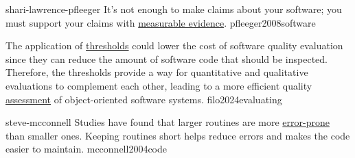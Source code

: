 \documentclass{article}
\begin{document}

\lnQuote
  {shari-lawrence-pfleeger}
  {It's not enough to make claims about your software; you must support your claims with \ul{measurable evidence}.}
  {pfleeger2008software}

  {The application of \ul{thresholds} could lower the cost of software quality evaluation since they can reduce the amount of software code that should be inspected. Therefore, the thresholds provide a way for quantitative and qualitative evaluations to complement each other, leading to a more efficient quality \ul{assessment} of object-oriented software systems.}
  {filo2024evaluating}



\lnQuote
  {steve-mcconnell}
  {Studies have found that larger routines are more \ul{error-prone} than smaller ones. Keeping routines short helps reduce errors and makes the code easier to maintain.}
  {mcconnell2004code}
\end{document}
